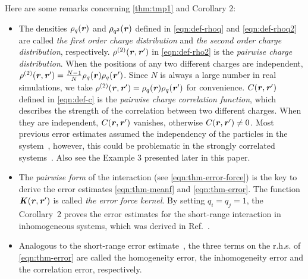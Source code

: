 \documentclass[journal=jacsat,manuscript=article]{achemso}
\newcommand{\redc}[1]{{\color{black} #1}}
\renewcommand{\v}[1]{\textbf{\textit{#1}}}
\begin{document}
Here are some remarks concerning \ref{thm:tmp1} and Corollary 2:
\begin{itemize}
\item The densities $\rho_q(\v r)$ and $\rho_{q^2}(\v r)$ defined in
  \ref{eqn:def-rhoq} and \ref{eqn:def-rhoq2} are called \emph{the
    first order charge distribution} and \emph{the
    second order charge distribution},
  respectively.
  $\rho^{(2)}(\v r, \v r')$ in \ref{eqn:def-rho2}
  is the \emph{pairwise charge distribution}.
  When the positions of any two different charges are independent,
  $\rho^{(2)}(\v r, \v r') = \frac{N-1}{N}\rho_q(\v r)\rho_q(\v r')$.
  Since $N$ is always a large number in real simulations, we take
  $\rho^{(2)}(\v r, \v r') = \rho_q(\v r)\rho_q(\v r')$ for convenience.
  $C(\v r, \v r')$ defined in
  \ref{eqn:def-c} is the \emph{pairwise charge correlation function},
  which describes the strength of the correlation between  two
  different charges. When they are independent, $C(\v r, \v r')$
  vanishes, otherwise $C(\v r, \v r') \neq 0$.
  Most \redc{previous} error estimates assumed the independency of the
  particles in the system~\cite{kolafa1992cutoff, hummer1995numerical, deserno1998mue2, petersen1995accuracy, wang2010optimizing, neelov2010interlaced, ballenegger2012convert, wang2012},
  however, this could be problematic in the strongly correlated
  systems~\cite{deserno1998mue2, wang2010optimizing, ballenegger2012convert}.
  Also see the Example 3 presented later in this paper.
\item
  The \emph{pairwise form}
  of the interaction (see \ref{eqn:thm-error-force}) is the key to derive
  the error estimates \ref{eqn:thm-meanf} and \ref{eqn:thm-error}.
  The function $\v K(\v r, \v r')$ is called \emph{the error force
    kernel}.
  By setting $q_i = q_j = 1$, the
  Corollary~2
  proves
  the error estimates for the short-range interaction
  in inhomogeneous systems, which was derived in Ref.~\cite{wang2012}. 
\item \redc{Analogous} to the short-range error estimate~\cite{wang2012}, the
  three terms on the r.h.s. of \ref{eqn:thm-error} are called the
  homogeneity error, the inhomogeneity error and the correlation
  error, respectively.

\end{itemize}
\end{document}
